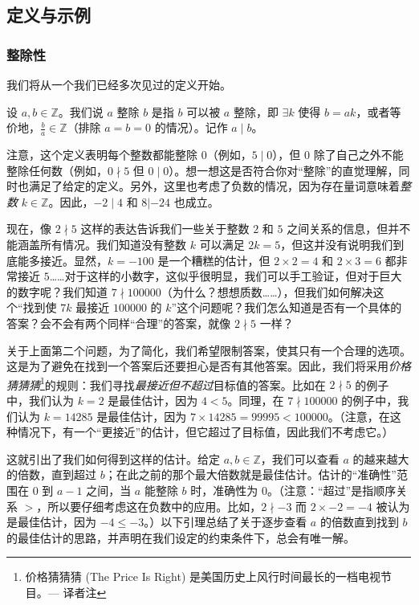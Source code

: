 
\subsection{定义与示例}

\subsubsection*{整除性}

我们将从一个我们已经多次见过的定义开始。

\begin{definition}
    设 $a,b \in \mathbb{Z}$。我们说 $a$ 整除 $b$ 是指 $b$ 可以被 $a$ 整除，即 $\exists k$ 使得 $b = ak$，或者等价地，$\frac{b}{a} \in \mathbb{Z}$（排除 $a=b=0$ 的情况）。记作 $a \mid b$。
\end{definition}

注意，这个定义表明每个整数都能整除 $0$（例如，$5 \mid 0$），但 $0$ 除了自己之外不能整除任何数（例如，$0 \nmid 5$ 但 $0 \mid 0$）。想一想这是否符合你对``整除''的直觉理解，同时也满足了给定的定义。另外，这里也考虑了负数的情况，因为存在量词意味着\emph{整数} $k \in \mathbb{Z}$。因此，$-2 \mid 4$ 和 $8 | -24$ 也成立。

现在，像 $2 \nmid 5$ 这样的表达告诉我们一些关于整数 $2$ 和 $5$ 之间关系的信息，但并不能涵盖所有情况。我们知道没有整数 $k$ 可以满足 $2k = 5$，但这并没有说明我们到底能多接近。显然，$k = -100$ 是一个糟糕的估计，但 $2 \times 2 = 4$ 和 $2 \times 3 = 6$ 都非常接近 $5$……对于这样的小数字，这似乎很明显，我们可以手工验证，但对于巨大的数字呢？我们知道 $7 \nmid 100000$（为什么？想想质数……），但我们如何解决这个``找到使 $7k$ 最接近 $100000$ 的 $k$''这个问题呢？我们怎么知道是否有一个具体的答案？会不会有两个同样``合理''的答案，就像 $2 \nmid 5$ 一样？

关于上面第二个问题，为了简化，我们希望限制答案，使其只有一个合理的选项。这是为了避免在找到一个答案后还要担心是否有其他答案。因此，我们将采用\emph{价格猜猜猜}\footnote{价格猜猜猜 (The Price Is Right) 是美国历史上风行时间最长的一档电视节目。--- 译者注}的规则：我们寻找\emph{最接近但不超过}目标值的答案。比如在 $2 \nmid 5$ 的例子中，我们认为 $k = 2$ 是最佳估计，因为 $4 < 5$。同理，在 $7 \nmid 100000$ 的例子中，我们认为 $k = 14285$ 是最佳估计，因为 $7 \times 14285 = 99995 < 100000$。（注意，在这种情况下，有一个``更接近''的估计，但它超过了目标值，因此我们不考虑它。）

这就引出了我们如何得到这样的估计。给定 $a, b \in \mathbb{Z}$，我们可以查看 $a$ 的越来越大的倍数，直到超过 $b$；在此之前的那个最大倍数就是最佳估计。估计的``准确性''范围在 $0$ 到 $a - 1$ 之间，当 $a$ 能整除 $b$ 时，准确性为 $0$。（注意：``超过''是指顺序关系 $>$，所以要仔细考虑这在负数中的应用。比如，$2 \nmid -3$ 而 $2 \times -2 = -4$ 被认为是最佳估计，因为 $-4 \le -3$。）以下引理总结了关于逐步查看 $a$ 的倍数直到找到 $b$ 的最佳估计的思路，并声明在我们设定的约束条件下，总会有唯一解。


